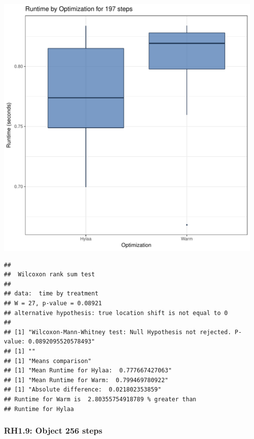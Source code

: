 \documentclass{article}\usepackage[]{graphicx}\usepackage[]{color}
\makeatletter
\def\maxwidth{ %
  \ifdim\Gin@nat@width>\linewidth
    \linewidth
  \else
    \Gin@nat@width
  \fi
}
\newenvironment{kframe}{%
 \def\at@end@of@kframe{}%
 \ifinner\ifhmode%
  \def\at@end@of@kframe{\end{minipage}}%
  \begin{minipage}{\columnwidth}%
 \fi\fi%
 \def\FrameCommand##1{\hskip\@totalleftmargin \hskip-\fboxsep
 \colorbox{shadecolor}{##1}\hskip-\fboxsep
     \hskip-\linewidth \hskip-\@totalleftmargin \hskip\columnwidth}%
 \MakeFramed {\advance\hsize-\width
   \@totalleftmargin\z@ \linewidth\hsize
   \@setminipage}}%
 {\par\unskip\endMakeFramed%
 \at@end@of@kframe}
\newenvironment{knitrout}{}{} %
\makeatother
\begin{document}
\begin{knitrout}
\color{fgcolor}
\includegraphics[width=\maxwidth]{figure/RH1_steps197-1} 
\begin{kframe}\begin{verbatim}
## 
## 	Wilcoxon rank sum test
## 
## data:  time by treatment
## W = 27, p-value = 0.08921
## alternative hypothesis: true location shift is not equal to 0
## 
## [1] "Wilcoxon-Mann-Whitney test: Null Hypothesis not rejected. P-value: 0.0892095520578493"
## [1] ""
## [1] "Means comparison"
## [1] "Mean Runtime for Hylaa:  0.777667427063"
## [1] "Mean Runtime for Warm:  0.799469780922"
## [1] "Absolute difference:  0.021802353859"
## Runtime for Warm is  2.80355754918789 % greater than 
## Runtime for Hylaa
\end{verbatim}
\end{kframe}
\end{knitrout}


\subsubsection{RH1.9: Object 256 steps}
\end{document}
